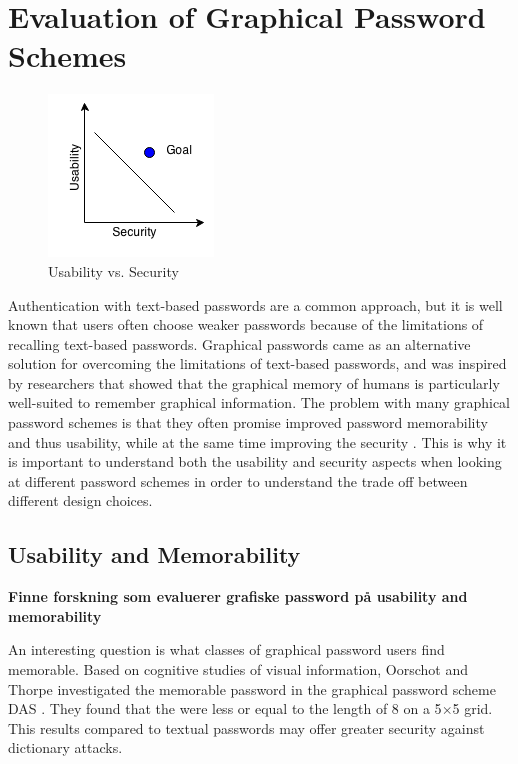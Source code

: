 \section{Evaluation of Graphical Password Schemes}

  \begin{figure}
    \vspace{-20pt}
    \begin{center}
      \includegraphics[scale=0.7]{pics/UsabilityVsSecurity.png}
    \end{center}
    \vspace{-20pt}
    \caption{Usability vs. Security}
    \vspace{-10pt}
  \end{figure}

  Authentication with text-based passwords are a common approach, but it is well known that users often choose weaker passwords because of the limitations of recalling text-based passwords. Graphical passwords came as an alternative solution for overcoming the limitations of text-based passwords, and was inspired by researchers that showed that the graphical memory of humans is particularly well-suited to remember graphical information\cite{DeAngeli}. The problem with many graphical password schemes is that they often promise improved password memorability and thus usability, while at the same time improving the security \cite{Biddle}. This is why it is important to understand both the usability and security aspects when looking at different password schemes in order to understand the trade off between different design choices.

\subsection{Usability and Memorability}

  {\color{red} \bf Finne forskning som evaluerer grafiske password på usability and memorability}

  An interesting question is what classes of graphical password users find memorable. Based on cognitive studies of visual information, Oorschot and Thorpe \cite{Thorpe} investigated the memorable password in the graphical password scheme DAS \cite{Jermyn}. They found that the were less or equal to the length of 8 on a 5$\times$5 grid. This results compared to textual passwords may offer greater security against dictionary attacks. 

